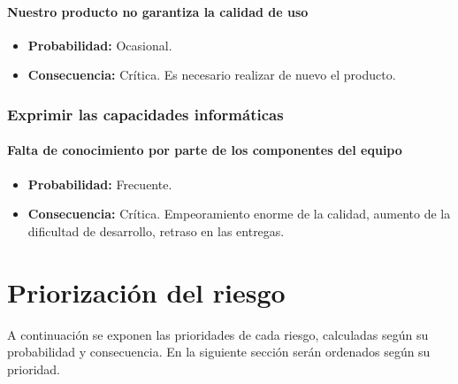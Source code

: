 \documentclass[spanish,a4paper,12pt]{report}	%
\begin{document}
	\subsection*{Nuestro producto no garantiza la calidad de uso}	
		\begin{itemize}
			\item \textbf {Probabilidad: }Ocasional.
			\item \textbf {Consecuencia: }Crítica. Es necesario realizar de nuevo el producto.
		\end{itemize}
		


%
\section{Exprimir las capacidades informáticas}

	\subsection*{Falta de conocimiento por parte de los componentes del equipo}	
		\begin{itemize}
			\item \textbf {Probabilidad: }Frecuente.
			\item \textbf {Consecuencia: }Crítica. Empeoramiento enorme de la calidad, aumento de la dificultad de desarrollo, retraso en las entregas.
		\end{itemize}
	



\newpage
\mbox{}
\thispagestyle{empty}						%
\newpage

\part{Priorización del riesgo}

%
\setcounter{section}{0}
A continuación se exponen las prioridades de cada riesgo, calculadas según su probabilidad y consecuencia. En la siguiente
sección serán ordenados según su prioridad.
\end{document}
